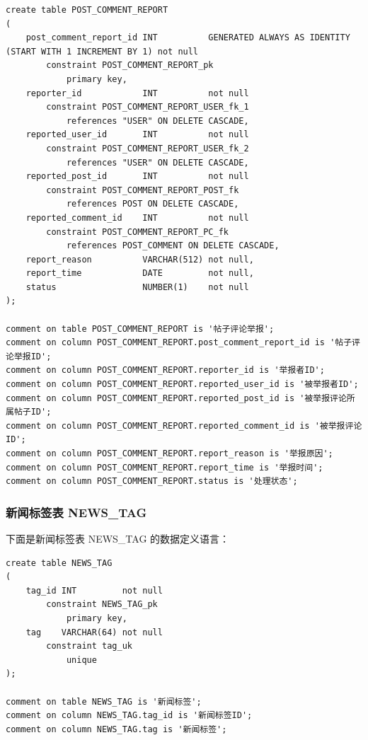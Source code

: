 \begin{verbatim}
create table POST_COMMENT_REPORT
(
    post_comment_report_id INT          GENERATED ALWAYS AS IDENTITY (START WITH 1 INCREMENT BY 1) not null
        constraint POST_COMMENT_REPORT_pk
            primary key,
    reporter_id            INT          not null
        constraint POST_COMMENT_REPORT_USER_fk_1
            references "USER" ON DELETE CASCADE,
    reported_user_id       INT          not null
        constraint POST_COMMENT_REPORT_USER_fk_2
            references "USER" ON DELETE CASCADE,
    reported_post_id       INT          not null
        constraint POST_COMMENT_REPORT_POST_fk
            references POST ON DELETE CASCADE,
    reported_comment_id    INT          not null
        constraint POST_COMMENT_REPORT_PC_fk
            references POST_COMMENT ON DELETE CASCADE,
    report_reason          VARCHAR(512) not null,
    report_time            DATE         not null,
    status                 NUMBER(1)    not null
);

comment on table POST_COMMENT_REPORT is '帖子评论举报';
comment on column POST_COMMENT_REPORT.post_comment_report_id is '帖子评论举报ID';
comment on column POST_COMMENT_REPORT.reporter_id is '举报者ID';
comment on column POST_COMMENT_REPORT.reported_user_id is '被举报者ID';
comment on column POST_COMMENT_REPORT.reported_post_id is '被举报评论所属帖子ID';
comment on column POST_COMMENT_REPORT.reported_comment_id is '被举报评论ID';
comment on column POST_COMMENT_REPORT.report_reason is '举报原因';
comment on column POST_COMMENT_REPORT.report_time is '举报时间';
comment on column POST_COMMENT_REPORT.status is '处理状态';
\end{verbatim}

\subsubsection{新闻标签表 NEWS\_TAG}

下面是新闻标签表 NEWS\_TAG 的数据定义语言：

\begin{verbatim}
create table NEWS_TAG
(
    tag_id INT         not null
        constraint NEWS_TAG_pk
            primary key,
    tag    VARCHAR(64) not null
        constraint tag_uk
            unique
);

comment on table NEWS_TAG is '新闻标签';
comment on column NEWS_TAG.tag_id is '新闻标签ID';
comment on column NEWS_TAG.tag is '新闻标签';
\end{verbatim}


